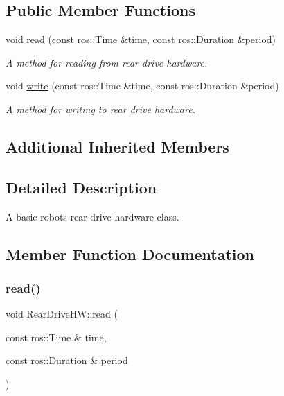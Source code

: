 \subsection*{Public Member Functions}
\begin{DoxyCompactItemize}
\item 
void \hyperlink{classRearDriveHW_adcce3bb0a7735810edeaf44bb2f71dee}{read} (const ros\+::\+Time \&time, const ros\+::\+Duration \&period)
\begin{DoxyCompactList}\small\item\em A method for reading from rear drive hardware. \end{DoxyCompactList}\item 
void \hyperlink{classRearDriveHW_a36461317b3f595464ef080259bc21fae}{write} (const ros\+::\+Time \&time, const ros\+::\+Duration \&period)
\begin{DoxyCompactList}\small\item\em A method for writing to rear drive hardware. \end{DoxyCompactList}\end{DoxyCompactItemize}
\subsection*{Additional Inherited Members}


\subsection{Detailed Description}
A basic robot\textquotesingle{}s rear drive hardware class. 

\subsection{Member Function Documentation}
\mbox{\label{classRearDriveHW_adcce3bb0a7735810edeaf44bb2f71dee}} 
\subsubsection{\texorpdfstring{read()}{read()}}
{\footnotesize\ttfamily void Rear\+Drive\+H\+W\+::read (\begin{DoxyParamCaption}\item[{const ros\+::\+Time \&}]{time,  }\item[{const ros\+::\+Duration \&}]{period }\end{DoxyParamCaption})\hspace{0.3cm}{\ttfamily [virtual]}}



